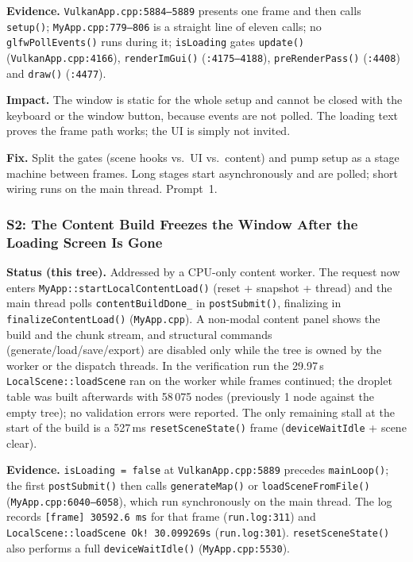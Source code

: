 \documentclass[11pt,a4paper]{article}
\begin{document}
\textbf{Evidence.} \texttt{VulkanApp.cpp:5884--5889} presents one frame and
then calls \texttt{setup()}; \texttt{MyApp.cpp:779--806} is a straight line of
eleven calls; no \texttt{glfwPollEvents()} runs during it; \texttt{isLoading}
gates \texttt{update()} (\texttt{VulkanApp.cpp:4166}), \texttt{renderImGui()}
(\texttt{:4175--4188}), \texttt{preRenderPass()} (\texttt{:4408}) and
\texttt{draw()} (\texttt{:4477}).

\textbf{Impact.} The window is static for the whole setup and cannot be
closed with the keyboard or the window button, because events are not polled.
The loading text proves the frame path works; the UI is simply not invited.

\textbf{Fix.} Split the gates (scene hooks vs.\ UI vs.\ content) and pump
setup as a stage machine between frames. Long stages start asynchronously and
are polled; short wiring runs on the main thread. Prompt~1.

\subsubsection*{S2: The Content Build Freezes the Window After the Loading
Screen Is Gone}

\textbf{Status (this tree).} Addressed by a CPU-only content worker. The
request now enters \texttt{MyApp::startLocalContentLoad()} (reset + snapshot +
thread) and the main thread polls \texttt{contentBuildDone\_} in
\texttt{postSubmit()}, finalizing in \texttt{finalizeContentLoad()}
(\texttt{MyApp.cpp}). A non-modal content panel shows the build and the chunk
stream, and structural commands (generate/load/save/export) are disabled only
while the tree is owned by the worker or the dispatch threads. In the
verification run the 29.97\,s \texttt{LocalScene::loadScene} ran on the worker
while frames continued; the droplet table was built afterwards with 58\,075
nodes (previously 1 node against the empty tree); no validation errors were
reported. The only remaining stall at the start of the build is a 527\,ms
\texttt{resetSceneState()} frame (\texttt{deviceWaitIdle} + scene clear).

\textbf{Evidence.} \texttt{isLoading = false} at
\texttt{VulkanApp.cpp:5889} precedes \texttt{mainLoop()}; the first
\texttt{postSubmit()} then calls \texttt{generateMap()} or
\texttt{loadSceneFromFile()} (\texttt{MyApp.cpp:6040--6058}), which run
synchronously on the main thread. The log records
\texttt{[frame] 30592.6 ms} for that frame (\texttt{run.log:311}) and
\texttt{LocalScene::loadScene Ok! 30.099269s} (\texttt{run.log:301}).
\texttt{resetSceneState()} also performs a full \texttt{deviceWaitIdle()}
(\texttt{MyApp.cpp:5530}).
\end{document}
